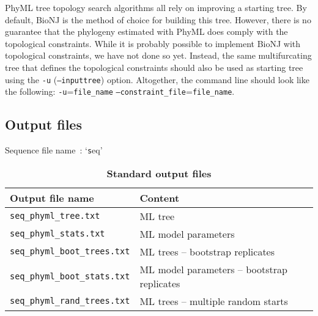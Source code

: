 \documentclass[a4paper,12pt]{article}
\newcommand{\x}[1]{\texttt{#1}}
\begin{document}
PhyML tree topology  search algorithms all rely on  improving a starting tree. By  default, BioNJ is
the method  of choice  for building this  tree. However,  there is no  guarantee that  the phylogeny
estimated with PhyML does comply with the  topological constraints. While it is probably possible to
implement  BioNJ  with  topological constraints,  we  have  not  done  so  yet.  Instead,  the  same
multifurcating tree  that defines the topological constraints  should also be used  as starting tree
using  the \x{-u}  (\x{--inputtree})  option. Altogether,  the  command line  should  look like  the
following: \x{-u}=\x{file\_name} \x{--constraint\_file}=\x{file\_name}.

\subsection{Output files}

\begin{table}
Sequence file name~: `{\x seq}'\\
\begin{center}
\begin{tabular}{ll}
\hline
Output file name & Content \\
\hline
\x{seq\_phyml\_tree.txt} & ML tree\\
\x{seq\_phyml\_stats.txt} &  ML model parameters\\
\x{seq\_phyml\_boot\_trees.txt} & ML trees -- bootstrap replicates\\
\x{seq\_phyml\_boot\_stats.txt} & ML model parameters -- bootstrap replicates \\
\x{seq\_phyml\_rand\_trees.txt} & ML trees -- multiple random starts\\
\hline
\end{tabular}
\end{center}
\caption{{\bf Standard output files}}\label{tab:output}
\end{table}
\end{document}
